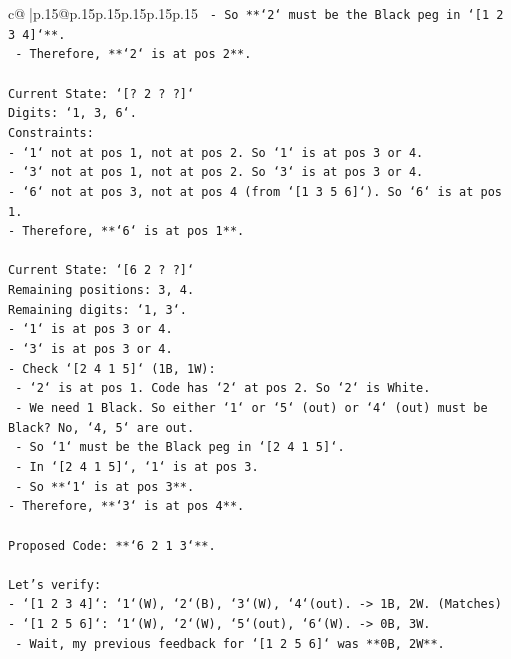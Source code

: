 \documentclass{article}
\begin{document}
{\begin{supertabular}{c@{$\;$}|p{.15\linewidth}@{}p{.15\linewidth}p{.15\linewidth}p{.15\linewidth}p{.15\linewidth}p{.15\linewidth}}
{{{\texttt{    {-} So **`2` must be the Black peg in `{[}1 2 3 4{]}`**.} \\
\texttt{    {-} Therefore, **`2` is at pos 2**.} \\
\\ 
\texttt{Current State: `{[}? 2 ? ?{]}`} \\
\texttt{Digits: `1, 3, 6`.} \\
\texttt{Constraints:} \\
\texttt{{-} `1` not at pos 1, not at pos 2. So `1` is at pos 3 or 4.} \\
\texttt{{-} `3` not at pos 1, not at pos 2. So `3` is at pos 3 or 4.} \\
\texttt{{-} `6` not at pos 3, not at pos 4 (from `{[}1 3 5 6{]}`). So `6` is at pos 1.} \\
\texttt{{-} Therefore, **`6` is at pos 1**.} \\
\\ 
\texttt{Current State: `{[}6 2 ? ?{]}`} \\
\texttt{Remaining positions: 3, 4.} \\
\texttt{Remaining digits: `1, 3`.} \\
\texttt{{-} `1` is at pos 3 or 4.} \\
\texttt{{-} `3` is at pos 3 or 4.} \\
\texttt{{-} Check `{[}2 4 1 5{]}` (1B, 1W):} \\
\texttt{    {-} `2` is at pos 1. Code has `2` at pos 2. So `2` is White.} \\
\texttt{    {-} We need 1 Black. So either `1` or `5` (out) or `4` (out) must be Black? No, `4, 5` are out.} \\
\texttt{    {-} So `1` must be the Black peg in `{[}2 4 1 5{]}`.} \\
\texttt{    {-} In `{[}2 4 1 5{]}`, `1` is at pos 3.} \\
\texttt{    {-} So **`1` is at pos 3**.} \\
\texttt{{-} Therefore, **`3` is at pos 4**.} \\
\\ 
\texttt{Proposed Code: **`6 2 1 3`**.} \\
\\ 
\texttt{Let's verify:} \\
\texttt{{-} `{[}1 2 3 4{]}`: `1`(W), `2`(B), `3`(W), `4`(out). {-}> 1B, 2W. (Matches)} \\
\texttt{{-} `{[}1 2 5 6{]}`: `1`(W), `2`(W), `5`(out), `6`(W). {-}> 0B, 3W.} \\
\texttt{    {-} Wait, my previous feedback for `{[}1 2 5 6{]}` was **0B, 2W**.} \\
}}}
\end{supertabular}}
\end{document}
